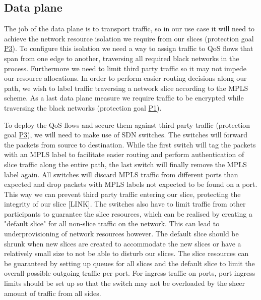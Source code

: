 \subsection{Data plane}
The job of the data plane is to transport traffic, so in our use case it will need to achieve the network resource isolation we require from our slices (protection goal \hyperref[P3]{P3}). To configure this isolation we need a way to assign traffic to QoS flows that span from one edge to another, traversing all required black networks in the process. Furthermore we need to limit third party traffic so it may not impede our resource allocations. In order to perform easier routing decisions along our path, we wish to label traffic traversing a network slice according to the MPLS scheme. As a last data plane measure we require traffic to be encrypted while traversing the black networks (protection goal \hyperref[P1]{P1}).

To deploy the QoS flows and secure them against third party traffic (protection goal \hyperref[P3]{P3}), we will need to make use of SDN switches. The switches will forward the packets from source to destination. While the first switch will tag the packets with an MPLS label to facilitate easier routing and perform authentication of slice traffic along the entire path, the last switch will finally remove the MPLS label again. All switches will discard MPLS traffic from different ports than expected and drop packets with MPLS labels not expected to be found on a port. This way we can prevent third party traffic entering our slice, protecting the integrity of our slice [LINK]. The switches also have to limit traffic from other participants to guarantee the slice resources, which can be realised by creating a "default slice" for all non-slice traffic on the network. This can lead to underprovisioning of network resources however. The default slice should be shrunk when new slices are created to accommodate the new slices or have a relatively small size to not be able to disturb our slices. The slice resources can be guaranteed by setting up queues for all slices and the default slice to limit the overall possible outgoing traffic per port. For ingress traffic on ports, port ingress limits should be set up so that the switch may not be overloaded by the sheer amount of traffic from all sides.

